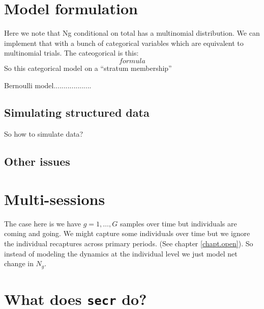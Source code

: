 \section{Model formulation}

Here we note that Ng conditional on total has a multinomial
distribution. We can implement that with a bunch of categorical
variables which are equivalent to multinomial trials.  The
cateogorical is this:
\[
formula
\]
So this categorical model on a ``stratum membership''

Bernoulli model...................

\subsection{Simulating structured data}

So how to simulate data?


\subsection{Other issues}


\section{Multi-sessions}

The case here is we have $g=1,\ldots,G$ samples over time but
individuals are coming and going.
We might capture some individuals over time but we ignore the
individual recaptures across primary periods. (See chapter
\ref{chapt.open}). So instead of modeling the dynamics at the individual
level we just model net change in $N_{g}$.


\section{What does \mbox{\tt secr} do?}




